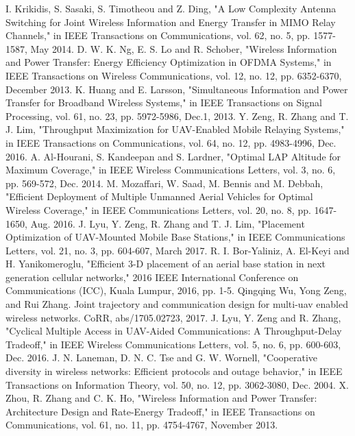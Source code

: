 \documentclass[12pt, draftclsnofoot, onecolumn]{IEEEtran}
\begin{document}
\begin{thebibliography}{99}
I. Krikidis, S. Sasaki, S. Timotheou and Z. Ding, "A Low Complexity Antenna Switching for Joint Wireless Information and Energy Transfer in MIMO Relay Channels," in IEEE Transactions on Communications, vol. 62, no. 5, pp. 1577-1587, May 2014.
D. W. K. Ng, E. S. Lo and R. Schober, "Wireless Information and Power Transfer: Energy Efficiency Optimization in OFDMA Systems," in IEEE Transactions on Wireless Communications, vol. 12, no. 12, pp. 6352-6370, December 2013.
K. Huang and E. Larsson, "Simultaneous Information and Power Transfer for Broadband Wireless Systems," in IEEE Transactions on Signal Processing, vol. 61, no. 23, pp. 5972-5986, Dec.1, 2013.
Y. Zeng, R. Zhang and T. J. Lim, "Throughput Maximization for UAV-Enabled Mobile Relaying Systems," in IEEE Transactions on Communications, vol. 64, no. 12, pp. 4983-4996, Dec. 2016.
A. Al-Hourani, S. Kandeepan and S. Lardner, "Optimal LAP Altitude for Maximum Coverage," in IEEE Wireless Communications Letters, vol. 3, no. 6, pp. 569-572, Dec. 2014.
M. Mozaffari, W. Saad, M. Bennis and M. Debbah, "Efficient Deployment of Multiple Unmanned Aerial Vehicles for Optimal Wireless Coverage," in IEEE Communications Letters, vol. 20, no. 8, pp. 1647-1650, Aug. 2016.
J. Lyu, Y. Zeng, R. Zhang and T. J. Lim, "Placement Optimization of UAV-Mounted Mobile Base Stations," in IEEE Communications Letters, vol. 21, no. 3, pp. 604-607, March 2017.
R. I. Bor-Yaliniz, A. El-Keyi and H. Yanikomeroglu, "Efficient 3-D placement of an aerial base station in next generation cellular networks," 2016 IEEE International Conference on Communications (ICC), Kuala Lumpur, 2016, pp. 1-5.
Qingqing Wu, Yong Zeng, and Rui Zhang. Joint trajectory and communication design for multi-uav enabled wireless networks. CoRR, abs/1705.02723, 2017.
J. Lyu, Y. Zeng and R. Zhang, "Cyclical Multiple Access in UAV-Aided Communications: A Throughput-Delay Tradeoff," in IEEE Wireless Communications Letters, vol. 5, no. 6, pp. 600-603, Dec. 2016.
J. N. Laneman, D. N. C. Tse and G. W. Wornell, "Cooperative diversity in wireless networks: Efficient protocols and outage behavior," in IEEE Transactions on Information Theory, vol. 50, no. 12, pp. 3062-3080, Dec. 2004.
X. Zhou, R. Zhang and C. K. Ho, "Wireless Information and Power Transfer: Architecture Design and Rate-Energy Tradeoff," in IEEE Transactions on Communications, vol. 61, no. 11, pp. 4754-4767, November 2013.

\end{thebibliography}
\end{document}
